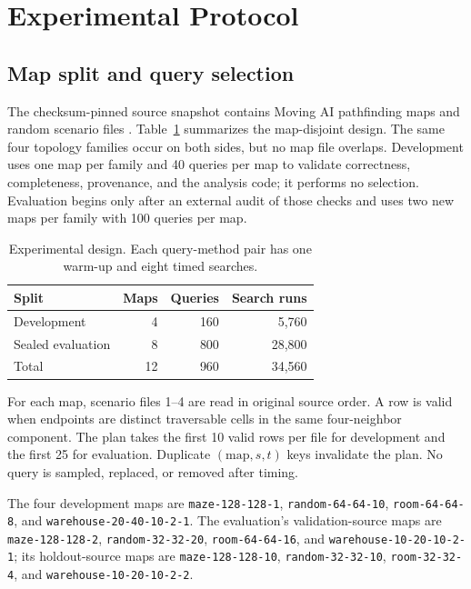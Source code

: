 \section{Experimental Protocol}
\label{sec:protocol}

\subsection{Map split and query selection}

The checksum-pinned source snapshot contains Moving AI pathfinding maps and
random scenario files \citep{sturtevant2012benchmarks}.  Table~\ref{tab:design}
summarizes the map-disjoint design.  The same four topology families occur on
both sides, but no map file overlaps.  Development uses one map per family and
40 queries per map to validate correctness, completeness, provenance, and the
analysis code; it performs no selection.  Evaluation begins only after an
external audit of those checks and uses two new maps per family with 100
queries per map.

\begin{table}[t]
\centering
\small
\caption{Experimental design.  Each query-method pair has one warm-up and eight
timed searches.}
\label{tab:design}
\begin{tabular}{lrrr}
\toprule
Split & Maps & Queries & Search runs \\
\midrule
Development & 4 & 160 & 5,760 \\
Sealed evaluation & 8 & 800 & 28,800 \\
\midrule
Total & 12 & 960 & 34,560 \\
\bottomrule
\end{tabular}
\end{table}

For each map, scenario files 1--4 are read in original source order.  A row is
valid when endpoints are distinct traversable cells in the same four-neighbor
component.  The plan takes the first 10 valid rows per file for development
and the first 25 for evaluation.  Duplicate $(\text{map},s,t)$ keys invalidate
the plan.  No query is sampled, replaced, or removed after timing.

The four development maps are
\texttt{maze-128-128-1}, \texttt{random-64-64-10},
\texttt{room-64-64-8}, and \texttt{warehouse-20-40-10-2-1}.
The evaluation's validation-source maps are
\texttt{maze-128-128-2}, \texttt{random-32-32-20},
\texttt{room-64-64-16}, and \texttt{warehouse-10-20-10-2-1};
its holdout-source maps are \texttt{maze-128-128-10},
\texttt{random-32-32-10}, \texttt{room-32-32-4}, and
\texttt{warehouse-10-20-10-2-2}.

